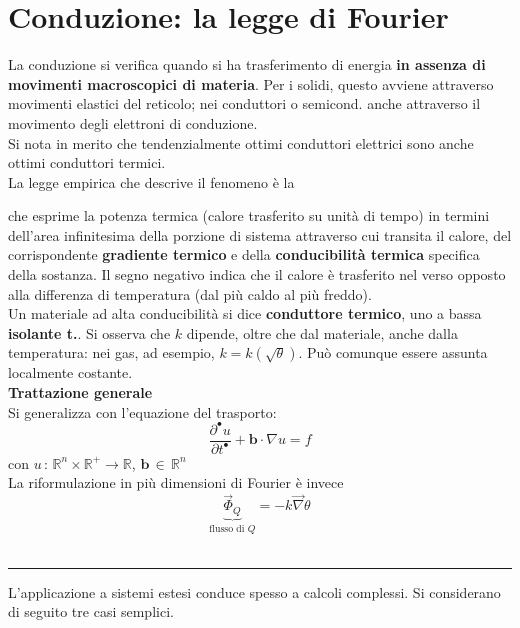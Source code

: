 \documentclass[10pt, oneside]{book}
\newcommand{\infobox}[2]{\vspace{0.5cm}~\\ \textbf{#1} \hrulefill \vspace{0.2cm}\\#2 {}\,\\\hrule \vspace{0.5cm}}
\newcommand{\lawbox}[2]{\begin{center}
\framebox{
\parbox{\linewidth}{
\vspace{0.3cm}
\textbf{#1} \hfill $\displaystyle #2$
\vspace{0.3cm}
}
}
\end{center}}
\newcommand{\ds}{\displaystyle}
\begin{document}
\section{Conduzione: la legge di Fourier}
La conduzione si verifica quando si ha trasferimento di energia \textbf{in assenza di movimenti macroscopici di materia}. Per i solidi, questo avviene attraverso movimenti elastici del reticolo; nei conduttori o semicond. anche attraverso il movimento degli elettroni di conduzione.\\
Si nota in merito che tendenzialmente ottimi conduttori elettrici sono anche ottimi conduttori termici.\\
La legge empirica che descrive il fenomeno è la
\lawbox{Legge (empirica) di Fourier}{\frac{\delta Q}{\mathrm{d} t} = - l \dd[•]{A} \dv[•]{\theta}{x}}
che esprime la potenza termica (calore trasferito su unità di tempo) in termini dell'area infinitesima della porzione di sistema attraverso cui transita il calore, del corrispondente \textbf{gradiente termico} e della \textbf{conducibilità termica} specifica della sostanza. Il segno negativo indica che il calore è trasferito nel verso opposto alla differenza di temperatura (dal più caldo al più freddo).\\
Un materiale ad alta conducibilità si dice \textbf{conduttore termico}, uno a bassa \textbf{isolante t.}. Si osserva che $k$ dipende, oltre che dal materiale, anche dalla temperatura: nei gas, ad esempio, $\ds k = k(\sqrt{\theta})$. Può comunque essere assunta localmente costante.
\infobox{Trattazione generale}{Si generalizza con l'equazione del trasporto:
\[\frac{\partial^{•} u}{\partial t^{•}} + \mathbf{b} \cdot \nabla u = f\]
con $u \, : \, \mathbb{R}^n \times \mathbb{R}^+ \rightarrow \mathbb{R}$, $\mathbf{b} \, \in \, \mathbb{R}^n$
\\La riformulazione in più dimensioni di Fourier è invece
\[\underbrace{\vec{\Phi}_Q}_{\textrm{flusso di } Q} = - k \vec{\nabla} \theta\]
}
L'applicazione a sistemi estesi conduce spesso a calcoli complessi. Si considerano di seguito tre casi semplici.
\end{document}
